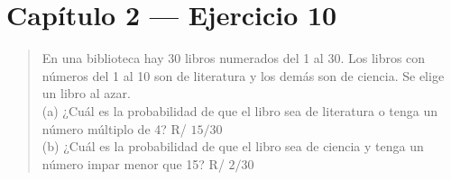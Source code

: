 \documentclass[11pt]{article}
\begin{document}
\section*{Capítulo 2 --- Ejercicio 10}

\begin{quote}
En una biblioteca hay 30 libros numerados del 1 al 30. Los libros con números del 1 al 10 son de
literatura y los demás son de ciencia. Se elige un libro al azar.\\
(a) ¿Cuál es la probabilidad de que el libro sea de literatura o tenga un número múltiplo de 4? \hfill R/ $15/30$\\
(b) ¿Cuál es la probabilidad de que el libro sea de ciencia y tenga un número impar menor que 15? \hfill R/ $2/30$
\end{quote}
\end{document}
